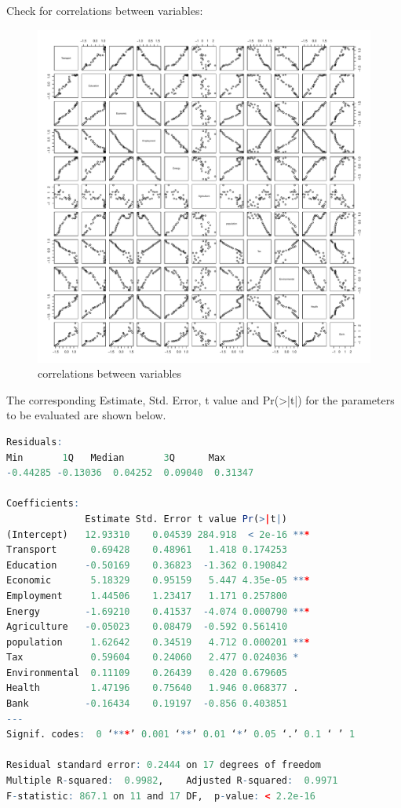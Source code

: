 \documentclass{apmcmthesis}
\begin{document}
Check for correlations between variables:
\begin{figure}[H]
	\centering
	\includegraphics[width=\linewidth]{cor}
	\caption{correlations between variables}
\end{figure}

The corresponding Estimate, Std. Error, t value and Pr(>|t|) for the parameters to be evaluated are shown below. 
\begin{lstlisting}[language=r]
Residuals:
Min       1Q   Median       3Q      Max 
-0.44285 -0.13036  0.04252  0.09040  0.31347 

Coefficients:
              Estimate Std. Error t value Pr(>|t|)    
(Intercept)   12.93310    0.04539 284.918  < 2e-16 ***
Transport      0.69428    0.48961   1.418 0.174253    
Education     -0.50169    0.36823  -1.362 0.190842    
Economic       5.18329    0.95159   5.447 4.35e-05 ***
Employment     1.44506    1.23417   1.171 0.257800    
Energy        -1.69210    0.41537  -4.074 0.000790 ***
Agriculture   -0.05023    0.08479  -0.592 0.561410    
population     1.62642    0.34519   4.712 0.000201 ***
Tax            0.59604    0.24060   2.477 0.024036 *  
Environmental  0.11109    0.26439   0.420 0.679605    
Health         1.47196    0.75640   1.946 0.068377 .  
Bank          -0.16434    0.19197  -0.856 0.403851    
---
Signif. codes:  0 ‘***’ 0.001 ‘**’ 0.01 ‘*’ 0.05 ‘.’ 0.1 ‘ ’ 1

Residual standard error: 0.2444 on 17 degrees of freedom
Multiple R-squared:  0.9982,	Adjusted R-squared:  0.9971 
F-statistic: 867.1 on 11 and 17 DF,  p-value: < 2.2e-16
\end{lstlisting}
\end{document}
